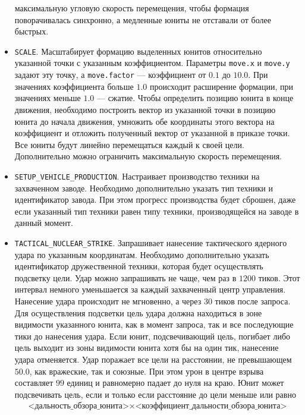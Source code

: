 \begin{itemize}
          максимальную угловую скорость перемещения, чтобы формация поворачивалась синхронно, а медленные юниты не отставали от более
          быстрых.
    \item \texttt{SCALE}. Масштабирует формацию выделенных юнитов относительно указанной точки с указанным коэффициентом. Параметры
          \texttt{move.x} и \texttt{move.y} задают эту точку, а \texttt{move.factor} --- коэффициент от $0.1$ до $10.0$. При значениях
          коэффициента больше $1.0$ происходит расширение формации, при значениях меньше $1.0$ --- сжатие. Чтобы определить позицию юнита в
          конце движения, необходимо построить вектор из указанной точки в позицию юнита до начала движения, умножить обе координаты этого
          вектора на коэффициент и отложить полученный вектор от указанной в приказе точки. Все юниты будут линейно перемещаться каждый к
          своей цели. Дополнительно можно ограничить максимальную скорость перемещения.
    \item \texttt{SETUP\_VEHICLE\_PRODUCTION}. Настраивает производство техники на захваченном заводе. Необходимо дополнительно указать тип
          техники и идентификатор завода. При этом прогресс производства будет сброшен, даже если указанный тип техники равен типу техники,
          производящейся на заводе в данный момент.
    \item \texttt{TACTICAL\_NUCLEAR\_STRIKE}. Запрашивает нанесение тактического ядерного удара по указанным координатам. Необходимо
          дополнительно указать идентификатор дружественной техники, которая будет осуществлять подсветку цели. Удар можно запрашивать не
          чаще, чем раз в $1200$ тиков. Этот интервал немного уменьшается за каждый захваченный центр управления. Нанесение удара происходит
          не мгновенно, а через $30$ тиков после запроса. Для осуществления подсветки цель удара должна находиться в зоне видимости
          указанного юнита, как в момент запроса, так и все последующие тики до нанесения удара. Если юнит, подсвечивающий цель, погибает
          либо цель выходит из зоны видимости юнита хотя бы на один тик, нанесение удара отменяется. Удар поражает все цели на расстоянии,
          не превышающем $50.0$, как вражеские, так и союзные. При этом урон в центре взрыва составляет $99$ единиц и равномерно падает до
          нуля на краю. Юнит может подсвечивать цель, если и только если расстояние до цели меньше или равно
          \begin{equation}
          \begin{split}
          \textit{<дальность\_обзора\_юнита>}\times\textit{<коэффициент\_дальности\_обзора\_юнита>}
          \end{split}
          \end{equation}
\end{itemize}

